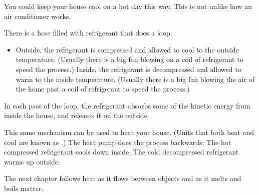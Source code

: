 You could keep your house cool on a hot day this way. This is not unlike how an air conditioner works.

There is a hose filled with refrigerant that does a loop: 
\begin{itemize}
\item Outside, the refrigerant is compressed and allowed to cool to the outside temperature. (Usually there is a big fan blowing on a coil of refrigerant to speed the process.)
Inside, the refrigerant is decompressed and allowed to warm to the inside temperature. (Usually there is a big fan blowing the air of the home past a coil of refrigerant to speed the process.)
\end{itemize}

In each pass of the loop, the refrigerant absorbs some of the kinetic energy from inside the house, and releases it on the outside.

This same mechanism can be used to heat your house. (Units that both heat and cool are known as .) 
The heat pump does the process backwards: The hot compressed refrigerant cools down inside. The cold decompressed refrigerant warms up outside.

The next chapter follows heat as it flows between objects and as it melts and boils matter.
